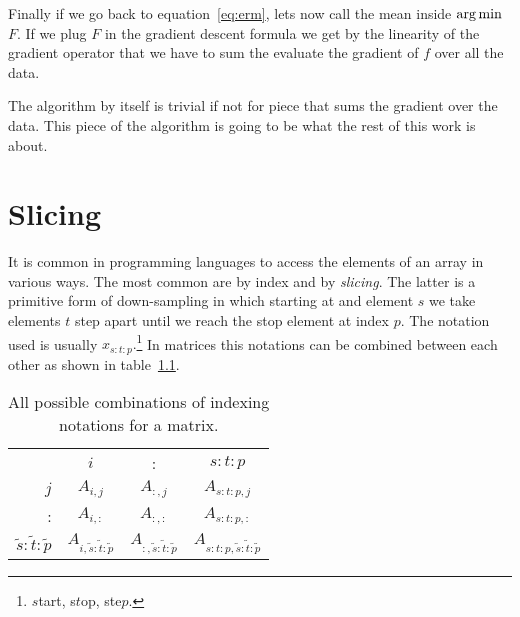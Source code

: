 \documentclass{sapthesis}
\begin{document}
Finally if we go back to equation~\ref{eq:erm}, lets now call the mean inside
$\mathop{\mathrm{arg\,min}}$ $F$. If we plug $F$ in the gradient descent formula we get by the
linearity of the gradient operator that we have to sum the evaluate the gradient
of $f$ over all the data.

The algorithm by itself is trivial if not for piece that sums the gradient over
the data. This piece of the algorithm is going to be what the rest of this
work is about.

\iffalse %
We could simplify the introduction by assuming single vector arguments and
convex optimization to then discharge those assumption later. This would allow
us to talk about this challenges in the generalization of this concepts.

We have to explicit that we don't care about over-fitting or regularization and
that stochastic approximation via randomly sampled minibatch are actually used.

Right now we ignore the local minima problem since we are not in the convex
case.

I have to use Cauchy-Schwarz to prove that negative gradient is always the
steepest descent direction.
\fi %
\fi

\chapter{Slicing}\label{sec:slicing}

\newcommand\slice{\mathrm{Slice}}
\newcommand\sss[2]{#2{s}{#1}#2{t}{#1}#2{p}}

It is common in programming languages to access the elements of an array in
various ways. The most common are by index and by \emph{slicing}. The latter is
a primitive form of down-sampling in which starting at and element \(s\) we take
elements \(t\) step apart until we reach the stop element at index \(p.\) The
notation used is usually \(x_{\sss:{}}.\)\footnote{\(s\)tart, s\(t\)op,
ste\(p.\)} In matrices this notations can be combined between each other as
shown in table~\ref{tab:slice}.

\begin{table}
    \newcommand{\p}{\tilde}
    \centering
    \begin{tabular}{cccc}
                                   & \(i\)       & :           & \(\sss:{}\) \\[2pt]
                                   \cline{2-4}
        \multicolumn{1}{r|}{\(j\)} & \(A_{i,j}\) & \(A_{:,j}\) & \(A_{\sss:{},j}\) \\
        \multicolumn{1}{r|}{:}     & \(A_{i,:}\) & \(A_{:,:}\) & \(A_{\sss:{},:}\) \\
        \multicolumn{1}{r|}{\(\sss:\p\)} & \(A_{i,\sss:{\p}}\) & \(A_{:,\sss:\p}\) & \(A_{\sss:{},\sss:\p}\)
    \end{tabular}
    \caption{All possible combinations of indexing notations for a matrix.}
    \label{tab:slice}
\end{table}
\end{document}
